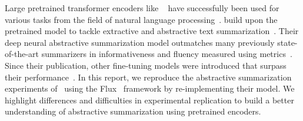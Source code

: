 Large pretrained transformer encoders like \Bert~\cite{DevlinCLT2019} have successfully been used for various tasks from the field of natural language processing~\cite{LiuL2019}. \citeauthor{LiuL2019} build upon the pretrained \Bert model to tackle extractive and abstractive text summarization~\cite{LiuL2019}. Their deep neural abstractive summarization model outmatches many previously state-of-the-art summarizers in informativeness and fluency measured using \Rouge metrics~\cite{LiuL2019,Lin2004}.
Since their publication, other fine-tuning models were introduced that surpass their performance~\cite{AghajanyanSGGZG2020,SavelievaAR2020}.
In this report, we reproduce the abstractive summarization experiments of~\citeauthor{LiuL2019} using the Flux~\cite{InnesSFGRJKPS2018} framework by re-implementing their \BertSumAbs model.
We highlight differences and difficulties in experimental replication to build a better understanding of abstractive summarization using pretrained encoders. 
